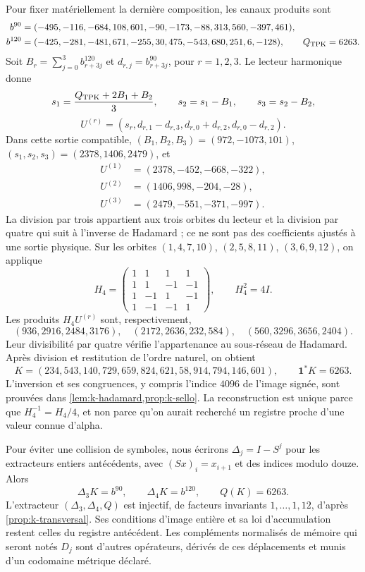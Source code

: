 Pour fixer matériellement la dernière composition, les canaux produits sont
\begin{align*}
 b^{90}&=(-495,-116,-684,108,601,-90,
                -173,-88,313,560,-397,461),\\
 b^{120}&=(-425,-281,-481,671,-255,30,
                 475,-543,680,251,6,-128),\qquad Q_{\rm TPK}=6263.
\end{align*}
Soit \(B_r=\sum_{j=0}^3b^{120}_{r+3j}\) et \(d_{r,j}=b^{90}_{r+3j}\), pour \(r=1,2,3\). Le lecteur harmonique donne
\[
 s_1=\frac{Q_{\rm TPK}+2B_1+B_2}{3},\qquad
 s_2=s_1-B_1,\qquad s_3=s_2-B_2,
\]
\[
 U^{(r)}=(s_r,d_{r,1}-d_{r,3},d_{r,0}+d_{r,2},d_{r,0}-d_{r,2}).
\]
Dans cette sortie compatible, \((B_1,B_2,B_3)=(972,-1073,101)\),
\((s_1,s_2,s_3)=(2378,1406,2479)\), et
\begin{align*}
 U^{(1)}&=(2378,-452,-668,-322),\\
 U^{(2)}&=(1406,998,-204,-28),\\
 U^{(3)}&=(2479,-551,-371,-997).
\end{align*}
La division par trois appartient aux trois orbites du lecteur et la division par quatre qui suit à l'inverse de Hadamard ; ce ne sont pas des coefficients ajustés à une sortie physique. Sur les orbites \((1,4,7,10)\), \((2,5,8,11)\), \((3,6,9,12)\), on applique
\[
 H_4=\begin{pmatrix}
 1&1&1&1\\1&1&-1&-1\\1&-1&1&-1\\1&-1&-1&1
 \end{pmatrix},\qquad H_4^2=4I.
\]
Les produits \(H_4U^{(r)}\) sont, respectivement,
\[
 (936,2916,2484,3176),\quad(2172,2636,232,584),
 \quad(560,3296,3656,2404).
\]
Leur divisibilité par quatre vérifie l’appartenance au sous-réseau de
Hadamard. Après division et restitution de l’ordre naturel, on obtient
\begin{equation}
 K=(234,543,140,729,659,824,621,58,914,794,146,601),
 \qquad\mathbf1^*K=6263.
 \label{lib01:K}
\end{equation}
L’inversion et ses congruences, y compris l’indice \(4096\) de l’image
signée, sont prouvées dans \cref{lem:k-hadamard,prop:k-sello}. La
reconstruction est unique parce que \(H_4^{-1}=H_4/4\), et non parce qu’on aurait
recherché un registre proche d’une valeur connue d’alpha.

Pour éviter une collision de symboles, nous écrirons
\(\Delta_j=I-S^j\) pour les extracteurs entiers antécédents, avec
\((Sx)_i=x_{i+1}\) et des indices modulo douze. Alors
\[
 \Delta_3K=b^{90},\qquad \Delta_4K=b^{120},\qquad Q(K)=6263.
\]
L'extracteur \((\Delta_3,\Delta_4,Q)\) est injectif, de facteurs invariants \(1,\ldots,1,12\), d'après \cref{prop:k-transversal}. Ses conditions d'image entière et sa loi d'accumulation restent celles du registre antécédent. Les compléments normalisés de mémoire qui seront notés \(D_j\) sont d'autres opérateurs, dérivés de ces déplacements et munis d'un codomaine métrique déclaré.

